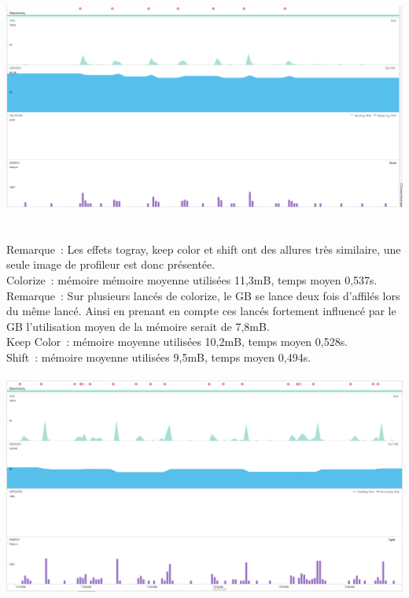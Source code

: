 \documentclass[12pt]{article}
\begin{document}
\\
    \includegraphics{1-togray}
\\

\\

\\

    Remarque :
    Les effets togray, keep color et shift ont des allures très similaire, une seule image de profileur est donc présentée.\\


    Colorize : mémoire  mémoire moyenne utilisées 11,3mB, temps moyen 0,537s.\\

    Remarque :
    Sur plusieurs lancés de colorize, le GB se lance deux fois d’affilés lors du même lancé. Ainsi en prenant en compte ces lancés fortement influencé par le GB l’utilisation moyen de la mémoire serait  de 7,8mB.\\

    Keep Color : mémoire moyenne utilisées 10,2mB, temps moyen 0,528s.\\


    Shift : mémoire moyenne utilisées 9,5mB, temps moyen 0,494s.\\






\\

    \includegraphics{1-shift}
\end{document}
